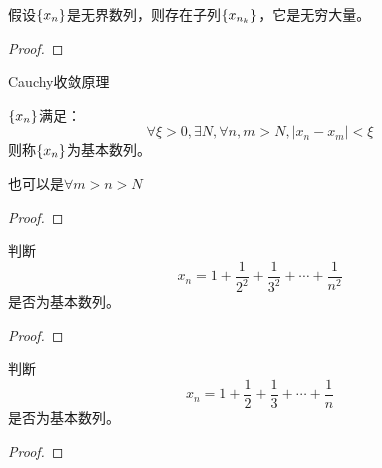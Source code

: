 \begin{theorem}
    假设$\left\{ x_n\right\}$是无界数列，则存在子列$\left\{ x_{n_k}\right\}$，它是无穷大量。
\end{theorem}
\begin{proof}
    
\end{proof}

Cauchy收敛原理

\begin{definition}
    $\left\{ x_n\right\}$满足：
    \[\forall \xi > 0, \exists N, \forall n, m > N, \left|x_n - x_m\right| < \xi \]
    则称$\left\{ x_n\right\}$为基本数列。
\end{definition}
也可以是$\forall m > n > N$
\begin{proof}
\end{proof}

\begin{proposition}
    判断
    \[ x_n = 1 + \frac{1}{2^2} + \frac{1}{3^2} + \cdots + \frac{1}{n^2} \]
    是否为基本数列。
\end{proposition}
\begin{proof}

\end{proof}

\begin{proposition}
    判断
    \[ x_n = 1 + \frac{1}{2} + \frac{1}{3} + \cdots + \frac{1}{n} \]
    是否为基本数列。
\end{proposition}
\begin{proof}

\end{proof}

